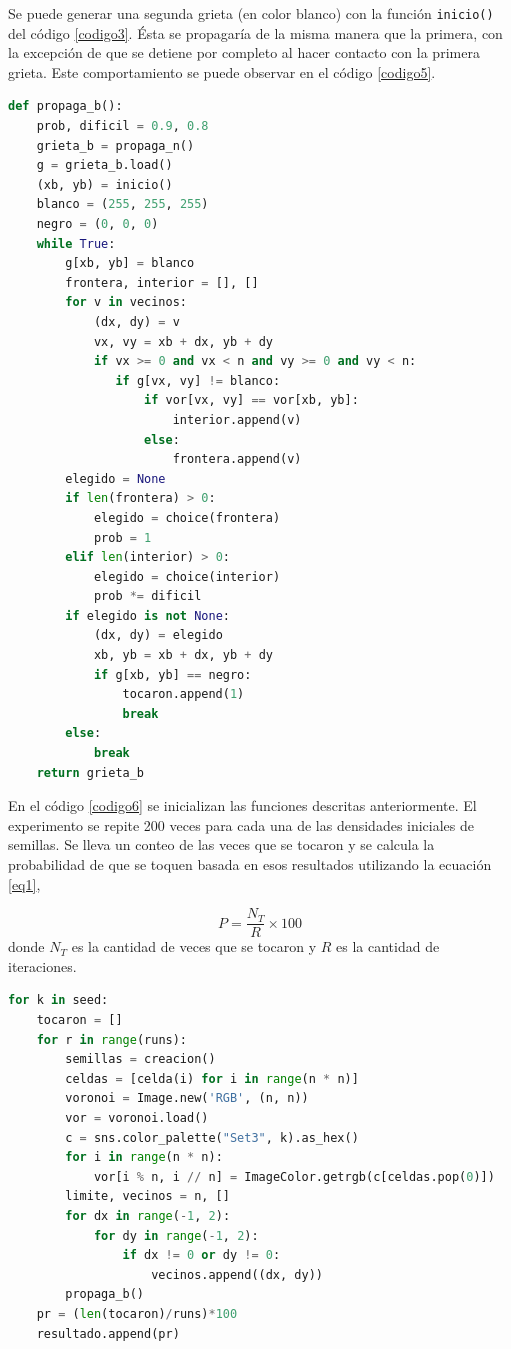 \documentclass{article}
\begin{document}
Se puede generar una segunda grieta (en color blanco) con la funci\'on \texttt{inicio()} del c\'odigo \ref{codigo3}. \'Esta se propagar\'ia de la misma manera que la primera, con la excepci\'on de que se detiene por completo al hacer contacto con la primera grieta. Este comportamiento se puede observar en el c\'odigo \ref{codigo5}.

\begin{lstlisting}[caption=Propagaci\'on de la segunda grieta, label=codigo5, language=Python]
def propaga_b():
    prob, dificil = 0.9, 0.8
    grieta_b = propaga_n()
    g = grieta_b.load()
    (xb, yb) = inicio()
    blanco = (255, 255, 255)
    negro = (0, 0, 0)
    while True:
        g[xb, yb] = blanco
        frontera, interior = [], []
        for v in vecinos:
            (dx, dy) = v
            vx, vy = xb + dx, yb + dy
            if vx >= 0 and vx < n and vy >= 0 and vy < n:
               if g[vx, vy] != blanco:
                   if vor[vx, vy] == vor[xb, yb]:
                       interior.append(v)
                   else:
                       frontera.append(v)
        elegido = None
        if len(frontera) > 0:
            elegido = choice(frontera)
            prob = 1
        elif len(interior) > 0:
            elegido = choice(interior)
            prob *= dificil
        if elegido is not None:
            (dx, dy) = elegido
            xb, yb = xb + dx, yb + dy
            if g[xb, yb] == negro:
                tocaron.append(1)
                break
        else:
            break
    return grieta_b
\end{lstlisting}

En el c\'odigo \ref{codigo6} se inicializan las funciones descritas anteriormente. El experimento se repite 200 veces para cada una de las densidades iniciales de semillas. Se lleva un conteo de las veces que se tocaron y se calcula la probabilidad de que se toquen basada en esos resultados utilizando la ecuaci\'on \ref{eq1},

\begin{equation}\label{eq1}
    P = \frac{N_T}{R} \times 100
\end{equation}
donde $N_T$ es la cantidad de veces que se tocaron y $R$ es la cantidad de iteraciones.
\begin{lstlisting}[caption=Iteraciones del experimento, label=codigo6, language=Python]
for k in seed:
    tocaron = []
    for r in range(runs):
        semillas = creacion()
        celdas = [celda(i) for i in range(n * n)]
        voronoi = Image.new('RGB', (n, n))
        vor = voronoi.load()
        c = sns.color_palette("Set3", k).as_hex()
        for i in range(n * n):
            vor[i % n, i // n] = ImageColor.getrgb(c[celdas.pop(0)])
        limite, vecinos = n, []
        for dx in range(-1, 2):
            for dy in range(-1, 2):
                if dx != 0 or dy != 0:
                    vecinos.append((dx, dy))
        propaga_b()
    pr = (len(tocaron)/runs)*100
    resultado.append(pr)
\end{lstlisting}
\end{document}
